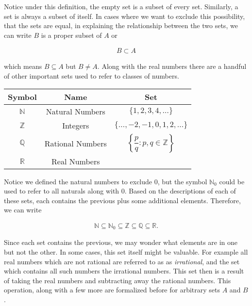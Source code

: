 \documentclass[twoside]{report}
\begin{document}
Notice under this definition, the empty set is a subset of every set. Similarly, a set is always a subset of itself. In cases where we want to exclude this possibility, that the sets are equal, in explaining the relationship between the two sets, we can write $B$ is a proper subset of $A$ or 

\begin{align*}
	B \subset A
\end{align*}

which means $B \subseteq A$ but $B \neq A$. Along with the real numbers there are a handful of other important sets used to refer to classes of numbers.

\vspace{\baselineskip}
\begin{center}
	\begin{tabular}{ccc}
		\toprule
		Symbol & Name & Set \\
		\midrule
		$\mathbb{N}$ & Natural Numbers & $\{1, 2, 3, 4, \dots\}$ \\[10pt]
		$\mathbb{Z}$ & Integers & $\{\dots, -2, -1, 0, 1, 2, \dots\}$ \\[10pt]
		$\mathbb{Q}$ & Rational Numbers & $\left\{ \dfrac{p}{q} : p,q \in \mathbb{Z}\right\}$ \\[10pt]
		$\mathbb{R}$ & Real Numbers & \\
		\bottomrule
	\end{tabular}
\end{center}
\vspace{\baselineskip}

Notice we defined the natural numbers to exclude 0, but the symbol $\mathbb{N}_0$ could be used to refer to all naturals along with 0. Based on the descriptions of each of these sets, each contains the previous plus some additional elements. Therefore, we can write

\begin{align}
	\mathbb{N} \subseteq \mathbb{N}_0 \subseteq \mathbb{Z} \subseteq \mathbb{Q} \subseteq \mathbb{R}.
\end{align}

Since each set contains the previous, we may wonder what elements are in one but not the other. In some cases, this set itself might be valuable. For example all real numbers which are not rational are  referred to as as \emph{irrational}, and the set which contains all such numbers the irrational numbers. This set then is a result of taking the real numbers and subtracting away the rational numbers. This operation, along with a few more are formalized before for arbitrary sets $A$ and $B$.
\end{document}
